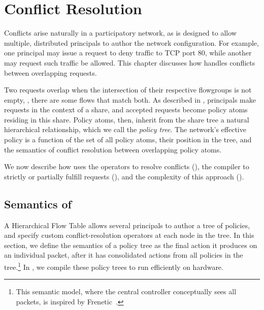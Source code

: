 \chapter{Conflict Resolution}
\label{sec:conflicts}

Conflicts arise naturally in a participatory network, as \sys is
designed to allow multiple, distributed principals to author the network configuration.
For example, one principal may issue a request to deny traffic to
TCP port 80, while another may request  such traffic be allowed.
This chapter discusses how \sys handles conflicts between overlapping requests.

Two requests overlap when the intersection of their
respective flowgroups is not empty, \ie, there are some flows that
match both.  As described in , principals
make requests in the context of a share, and accepted requests
become policy atoms residing in this share. Policy atoms, then,
inherit from the share tree a natural hierarchical relationship,
which we call the \emph{policy tree}. The network's effective policy is a function
of the set of all policy atoms, their position in the tree, and the
semantics of conflict resolution between overlapping policy atoms.

{\color{red}
We now describe how \sys uses the operators to resolve conflicts (),
the compiler to strictly or partially fulfill requests (),
and the complexity of this approach ().
}

\section{Semantics of \treelang}
\label{sec:Implementation}

A Hierarchical Flow Table allows several principals to author a tree of policies, and
specify custom conflict-resolution operators at each node in the
tree. In this section, we define the semantics of a policy tree as the
final action it produces on an individual packet, after it has
consolidated actions from all policies in the tree.\footnote{This
  semantic model, where the central controller conceptually sees all
  packets, is inspired by Frenetic~\cite{Foster:2010}.}
In , we compile these policy trees to run efficiently on hardware.

